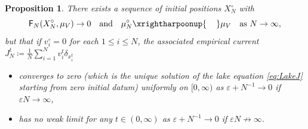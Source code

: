 \documentclass[JEP,XML,SOM,Unicode,published]{cedram}
\theoremstyle{plain}
\newtheorem{prop}[thm]{Proposition}
\theoremstyle{definition}
\let\vep\varepsilon
\newcommand{\XN}{X_N}
\newcommand{\Fr}{\mathsf{F}}
\begin{document}
\begin{prop}\label{prop:1DCou}
There exists a sequence of initial positions $\XN^\circ$ with
\[
\Fr_N(\XN^\circ,\mu_V)\to 0\quad\text{and}\quad\mu_N^\circ \xrightharpoonup{\hphantom{\to\,}} \mu_V\quad\text{as }N\to\infty,
\]
but that if {$v_i^\circ = 0$ for each $1\le i\le N$}, the associated empirical current $J_N^t \coloneqq \frac1N\sum_{i=1}^N v_i^t\delta_{x_i^t}$
\begin{itemize}
\item converges to zero (which is the unique solution of the lake equation \eqref{eq:LakeJ} {starting from zero initial datum}) uniformly on $[0,\infty)$ as $\vep+N^{-1}\to 0$ if $\vep N\to \infty$,
\item has no weak limit for any $t\in (0,\infty)$ as $\vep+N^{-1}\to 0$ if $\vep N \not\to \infty$.
\end{itemize}
\end{prop}
\end{document}
